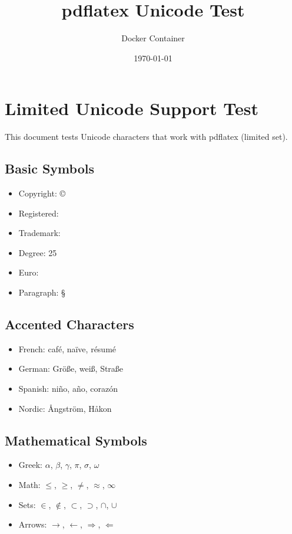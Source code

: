 \documentclass[12pt,a4paper]{article}
\title{pdflatex Unicode Test}
\author{Docker Container}
\date{\today}
\begin{document}
\maketitle

\section{Limited Unicode Support Test}
This document tests Unicode characters that work with pdflatex (limited set).

\subsection{Basic Symbols}
\begin{itemize}
    \item Copyright: \copyright
    \item Registered: \textregistered
    \item Trademark: \texttrademark
    \item Degree: 25\textcelsius
    \item Euro: \texteuro
    \item Paragraph: \S
\end{itemize}

\subsection{Accented Characters}
\begin{itemize}
    \item French: caf\'e, na\"ive, r\'esum\'e
    \item German: Gr\"o{\ss}e, wei{\ss}, Stra{\ss}e
    \item Spanish: ni\~no, a\~no, coraz\'on
    \item Nordic: \AA ngstr\"om, H\aa kon
\end{itemize}

\subsection{Mathematical Symbols}
\begin{itemize}
    \item Greek: $\alpha$, $\beta$, $\gamma$, $\pi$, $\sigma$, $\omega$
    \item Math: $\leq$, $\geq$, $\neq$, $\approx$, $\infty$
    \item Sets: $\in$, $\notin$, $\subset$, $\supset$, $\cap$, $\cup$
    \item Arrows: $\rightarrow$, $\leftarrow$, $\Rightarrow$, $\Leftarrow$
\end{itemize}
\end{document}
